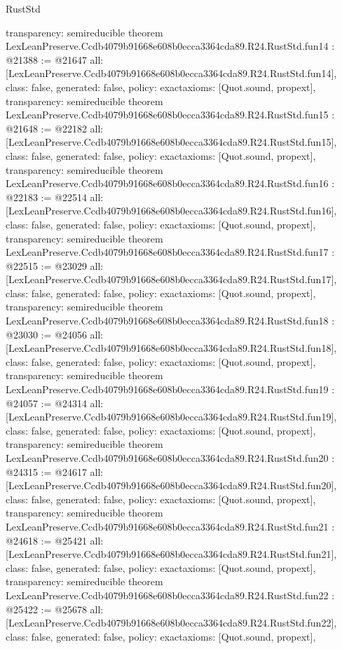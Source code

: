 \begin{lexlean}{RustStd}
\begin{coremodule}
{  transparency: semireducible
}
theorem LexLeanPreserve.Ccdb4079b91668e608b0ecca3364cda89.R24.RustStd.fun14 : @21388 := @21647 {
  all: [LexLeanPreserve.Ccdb4079b91668e608b0ecca3364cda89.R24.RustStd.fun14],
  class: false,
  generated: false,
  policy: exact{axioms: [Quot.sound, propext]},
  transparency: semireducible
}
theorem LexLeanPreserve.Ccdb4079b91668e608b0ecca3364cda89.R24.RustStd.fun15 : @21648 := @22182 {
  all: [LexLeanPreserve.Ccdb4079b91668e608b0ecca3364cda89.R24.RustStd.fun15],
  class: false,
  generated: false,
  policy: exact{axioms: [Quot.sound, propext]},
  transparency: semireducible
}
theorem LexLeanPreserve.Ccdb4079b91668e608b0ecca3364cda89.R24.RustStd.fun16 : @22183 := @22514 {
  all: [LexLeanPreserve.Ccdb4079b91668e608b0ecca3364cda89.R24.RustStd.fun16],
  class: false,
  generated: false,
  policy: exact{axioms: [Quot.sound, propext]},
  transparency: semireducible
}
theorem LexLeanPreserve.Ccdb4079b91668e608b0ecca3364cda89.R24.RustStd.fun17 : @22515 := @23029 {
  all: [LexLeanPreserve.Ccdb4079b91668e608b0ecca3364cda89.R24.RustStd.fun17],
  class: false,
  generated: false,
  policy: exact{axioms: [Quot.sound, propext]},
  transparency: semireducible
}
theorem LexLeanPreserve.Ccdb4079b91668e608b0ecca3364cda89.R24.RustStd.fun18 : @23030 := @24056 {
  all: [LexLeanPreserve.Ccdb4079b91668e608b0ecca3364cda89.R24.RustStd.fun18],
  class: false,
  generated: false,
  policy: exact{axioms: [Quot.sound, propext]},
  transparency: semireducible
}
theorem LexLeanPreserve.Ccdb4079b91668e608b0ecca3364cda89.R24.RustStd.fun19 : @24057 := @24314 {
  all: [LexLeanPreserve.Ccdb4079b91668e608b0ecca3364cda89.R24.RustStd.fun19],
  class: false,
  generated: false,
  policy: exact{axioms: [Quot.sound, propext]},
  transparency: semireducible
}
theorem LexLeanPreserve.Ccdb4079b91668e608b0ecca3364cda89.R24.RustStd.fun20 : @24315 := @24617 {
  all: [LexLeanPreserve.Ccdb4079b91668e608b0ecca3364cda89.R24.RustStd.fun20],
  class: false,
  generated: false,
  policy: exact{axioms: [Quot.sound, propext]},
  transparency: semireducible
}
theorem LexLeanPreserve.Ccdb4079b91668e608b0ecca3364cda89.R24.RustStd.fun21 : @24618 := @25421 {
  all: [LexLeanPreserve.Ccdb4079b91668e608b0ecca3364cda89.R24.RustStd.fun21],
  class: false,
  generated: false,
  policy: exact{axioms: [Quot.sound, propext]},
  transparency: semireducible
}
theorem LexLeanPreserve.Ccdb4079b91668e608b0ecca3364cda89.R24.RustStd.fun22 : @25422 := @25678 {
  all: [LexLeanPreserve.Ccdb4079b91668e608b0ecca3364cda89.R24.RustStd.fun22],
  class: false,
  generated: false,
  policy: exact{axioms: [Quot.sound, propext]},
}
\end{coremodule}
\end{lexlean}
